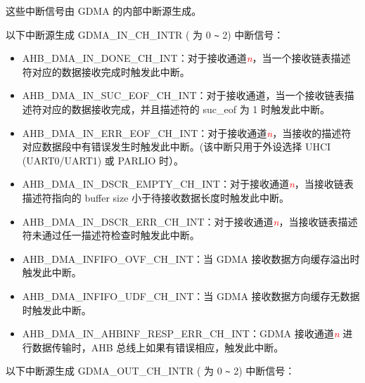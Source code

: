 \documentclass[main\_\_CN.tex]{subfiles}
\begin{document}
这些中断信号由 GDMA 的内部中断源生成。

以下中断源生成 GDMA\_IN\_CH\_INTR ( 为 0 \verb+~+ 2) 中断信号：

\begin{itemize}
    \item \label{int:GDMAINDONEINT}AHB\_DMA\_IN\_DONE\_CH\_INT：对于接收通道\textcolor{red}{\it{n}}，当一个接收链表描述符对应的数据接收完成时触发此中断。
    \item \label{int:GDMAINSUCEOFINT}AHB\_DMA\_IN\_SUC\_EOF\_CH\_INT：对于接收通道，当一个接收链表描述符对应的数据接收完成，并且描述符的 suc\_eof 为 1 时触发此中断。
    \item \label{int:GDMAINERREOFINT}AHB\_DMA\_IN\_ERR\_EOF\_CH\_INT：对于接收通道\textcolor{red}{\it{n}}，当接收的描述符对应数据段中有错误发生时触发此中断。(该中断只用于外设选择 UHCI (UART0/UART1) 或 PARLIO 时）。
    \item \label{int:GDMAINDSCREMPTYINT}AHB\_DMA\_IN\_DSCR\_EMPTY\_CH\_INT：对于接收通道\textcolor{red}{\it{n}}，当接收链表描述符指向的 buffer size 小于待接收数据长度时触发此中断。
    \item \label{int:GDMAINDSCRERRINT}AHB\_DMA\_IN\_DSCR\_ERR\_CH\_INT：对于接收通道\textcolor{red}{\it{n}}，当接收链表描述符未通过任一描述符检查时触发此中断。
    \item \label{int:GDMAINFIFOOVFINT} AHB\_DMA\_INFIFO\_OVF\_CH\_INT：当 GDMA 接收数据方向缓存溢出时触发此中断。
    \item \label{int:GDMAINFIFOUDFINT}AHB\_DMA\_INFIFO\_UDF\_CH\_INT：当 GDMA 接收数据方向缓存无数据时触发此中断。
    \item \label{int:GDMAINAHBINFRESPERRINT}AHB\_DMA\_IN\_AHBINF\_RESP\_ERR\_CH\_INT：GDMA 接收通道\textcolor{red}{\it{n}} 进行数据传输时，AHB 总线上如果有错误相应，触发此中断。
\end{itemize}

以下中断源生成 GDMA\_OUT\_CH\_INTR ( 为 0 \verb+~+ 2) 中断信号：
\end{document}

